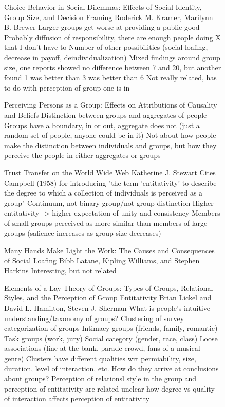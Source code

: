 \begin{subfigure}{0.48\textwidth}
Choice Behavior in Social Dilemmas: Effects of Social Identity, Group Size, and Decision Framing
Roderick M. Kramer, Marilynn B. Brewer
	Larger groups get worse at providing a public good
		Probably diffusion of responsibility, there are enough people doing X that I don't have to
		Number of other possibilities (social loafing, decrease in payoff, deindividualization)
	Mixed findings around group size, one reports showed no difference between 7 and 20, but another found 1 was better than 3 was better than 6
	Not really related, has to do with perception of group one is in

Perceiving Persons as a Group: Effects on Attributions of Causality and Beliefs
	Distinction between groups and aggregates of people
	Groups have a boundary, in or out, aggregate does not (just a random set of people, anyone could be in it)
	Not about how people make the distinction between individuals and groups, but how they perceive the people in either aggregates or groups

Trust Transfer on the World Wide Web
Katherine J. Stewart
	Cites Campbell (1958) for introducing "the term 'entitativity' to describe the degree to which a collection of individuals is perceived as a group"
		Continuum, not binary group/not group distinction
		Higher entitativity -> higher expectation of unity and consistency
	Members of small groups perceived as more similar than members of large groups (salience increases as group size decreases)

Many Hands Make Light the Work: The Causes and Consequences of Social Loafing
Bibb Latane, Kipling Williams, and Stephen Harkins
	Interesting, but not related


Elements of a Lay Theory of Groups: Types of Groups, Relational Styles, and the Perception of Group Entitativity
Brian Lickel and David L. Hamilton, Steven J. Sherman
	What is people's intuitive understanding/taxonomy of groups?
		Clustering of survey categorization of groups
			Intimacy groups (friends, family, romantic)
			Task groups (work, jury)
			Social category (gender, race, class)
			Loose associations (line at the bank, parade crowd, fans of a musical genre)
		Clusters have different qualities wrt permiability, size, duration, level of interaction, etc. 
	How do they arrive at conclusions about groups?
	Perception of relationsl style in the group and perception of entitativity are related
		unclear how degree vs quality of interaction affects perception of entitativity



\end{subfigure}
